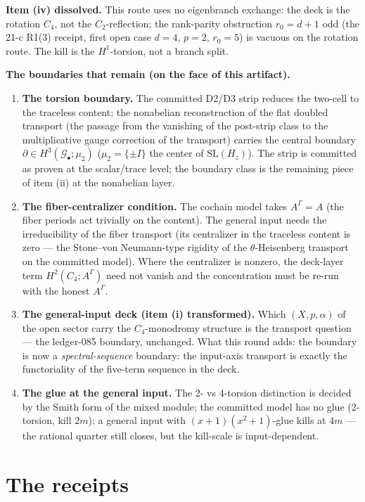 \documentclass[11pt]{article}
\newcommand{\GammaL}{\Gamma}
\newcommand{\Cfour}{C_4}
\newcommand{\Gbul}{\mathcal{G}_\bullet}
\begin{document}
\textbf{Item (iv) dissolved.} This route uses no eigenbranch exchange:
the deck is the rotation $\Cfour$, not the $C_2$-reflection; the
rank-parity obstruction $r_0=d+1$ odd (the 21-c R1(3) receipt, first
open case $d=4$, $p=2$, $r_0=5$) is vacuous on the rotation route. The
kill is the $H^1$-torsion, not a branch split.

\textbf{The boundaries that remain (on the face of this artifact).}
\begin{enumerate}
\item[(a)] \textbf{The torsion boundary.} The committed D2/D3 strip
reduces the two-cell to the traceless content; the nonabelian
reconstruction of the flat doubled transport (the passage from the
vanishing of the post-strip class to the multiplicative gauge
correction of the transport) carries the central boundary
$\partial\in H^3(\Gbul;\mu_2)$ ($\mu_2=\{\pm I\}$ the center of
$\mathrm{SL}(H_z)$). The strip is committed as proven at the
scalar/trace level; the boundary class is the remaining piece of item
(ii) at the nonabelian layer.
\item[(b)] \textbf{The fiber-centralizer condition.} The cochain model
takes $A^\GammaL=A$ (the fiber periods act trivially on the content).
The general input needs the irreducibility of the fiber transport
(its centralizer in the traceless content is zero — the Stone--von
Neumann-type rigidity of the $\theta$-Heisenberg transport on the
committed model). Where the centralizer is nonzero, the deck-layer
term $H^2(\Cfour;A^\GammaL)$ need not vanish and the concentration
must be re-run with the honest $A^\GammaL$.
\item[(c)] \textbf{The general-input deck (item (i) transformed).}
Which $(X,p,\alpha)$ of the open sector carry the $\Cfour$-monodromy
structure is the transport question — the ledger-085 boundary,
unchanged. What this round adds: the boundary is now a
\emph{spectral-sequence} boundary: the input-axis transport is exactly
the functoriality of the five-term sequence in the deck.
\item[(d)] \textbf{The glue at the general input.} The 2- vs 4-torsion
distinction is decided by the Smith form of the mixed module; the
committed model has no glue (2-torsion, kill $2m$); a general input
with $(x{+}1)(x^2{+}1)$-glue kills at $4m$ — the rational quarter still
closes, but the kill-scale is input-dependent.
\end{enumerate}

\section{The receipts}
\end{document}
